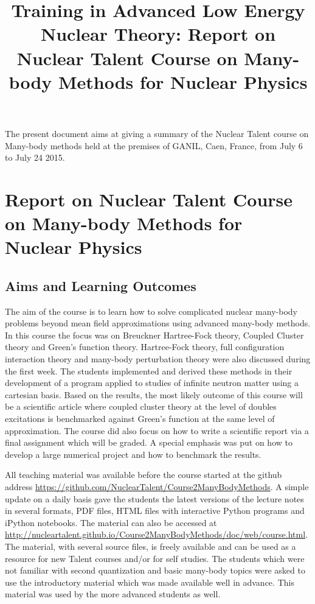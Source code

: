 \documentclass[prc,amsart,english]{revtex4}
\begin{document}
\title{Training in Advanced Low Energy Nuclear Theory: Report on Nuclear Talent Course on Many-body Methods for Nuclear Physics}
\maketitle
The present document aims at giving a summary of the 
Nuclear Talent course on Many-body methods held at the premises of GANIL, Caen, France, from July 6 to July 24 2015. 

\section{Report on Nuclear Talent Course on Many-body Methods for Nuclear Physics}

\subsection{Aims and Learning Outcomes}
The aim of the course is to learn how to solve complicated nuclear
many-body problems beyond mean field approximations using advanced
many-body methods. In this course the focus was on Breuckner
Hartree-Fock theory, Coupled Cluster theory and Green's function
theory. Hartree-Fock theory, full configuration interaction theory and
many-body perturbation theory were also discussed during the first
week.  The students implemented and derived these methods in their
development of a program applied to studies of infinite neutron matter
using a cartesian basis. Based on the results, the most likely outcome
of this course will be a scientific article where coupled cluster theory
at the level of doubles excitations is benchmarked against Green's
function at the same level of approximation.  The course did also
focus on how to write a scientific report via a final assignment which
will be graded. A special emphasis was put on how to develop a large
numerical project and how to benchmark the results.

All teaching material was available before the course started at the github address \url{https://github.com/NuclearTalent/Course2ManyBodyMethods}. A simple update on a daily basis gave the students the latest versions of the lecture notes in several formats, PDF files, HTML files with interactive Python programs and iPython notebooks. 
The material can also be accessed at \url{http://nucleartalent.github.io/Course2ManyBodyMethods/doc/web/course.html}.
The material, with several source files,  is freely available and can be used as a resource for new Talent courses and/or for self studies. 
The students which were not familiar with second quantization and basic many-body topics were asked to use the introductory material which was made available well in advance. This material was used by the more advanced students as well. 
\end{document}
